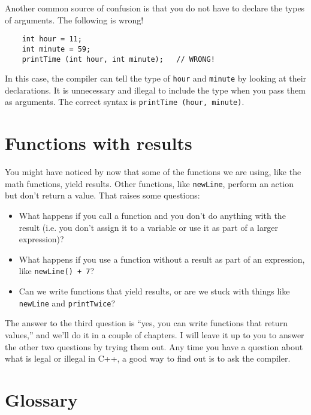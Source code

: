 Another common source of confusion is that you do not have
to declare the types of arguments.  The following is wrong!

\begin{verbatim}
    int hour = 11;
    int minute = 59;
    printTime (int hour, int minute);   // WRONG!
\end{verbatim}
%
In this case, the compiler can tell the type of {\tt hour}
and {\tt minute} by looking at their declarations.  It is
unnecessary and illegal to include the type when you pass them
as arguments.  The correct
syntax is {\tt printTime (hour, minute)}.

\section {Functions with results}

You might have noticed by now that some of the functions we are using,
like the math functions, yield results.  Other functions,
like {\tt newLine}, perform an action but
don't return a value.  That raises some questions:

\begin{itemize}

\item What happens if you call a function and you don't
do anything with the result (i.e. you don't assign it to
a variable or use it as part of a larger expression)?

\item What happens if you use a function without a result as part
of an expression, like {\tt newLine() + 7}?

\item Can we write functions that yield results, or are we
stuck with things like {\tt newLine} and {\tt printTwice}?

\end{itemize}

The answer to the third question is ``yes, you can write functions that
return values,'' and we'll do it in a couple of chapters.  I will
leave it up to you to answer the other two questions by trying them
out.  Any time you have a question about what is legal or
illegal in C++, a good way to find out is to ask the compiler.

\section{Glossary}


